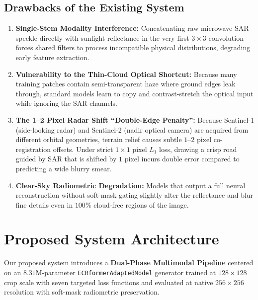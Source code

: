 \documentclass[12pt,a4paper]{report}
\begin{document}
\subsection{Drawbacks of the Existing System}
\begin{enumerate}
    \item \textbf{Single-Stem Modality Interference:} Concatenating raw microwave SAR speckle directly with sunlight reflectance in the very first $3\times 3$ convolution forces shared filters to process incompatible physical distributions, degrading early feature extraction.
    \item \textbf{Vulnerability to the Thin-Cloud Optical Shortcut:} Because many training patches contain semi-transparent haze where ground edges leak through, standard models learn to copy and contrast-stretch the optical input while ignoring the SAR channels.
    \item \textbf{The 1--2 Pixel Radar Shift ``Double-Edge Penalty'':} Because Sentinel-1 (side-looking radar) and Sentinel-2 (nadir optical camera) are acquired from different orbital geometries, terrain relief causes subtle $1$--$2\text{ pixel}$ co-registration offsets. Under strict $1\times 1$ pixel $L_1$ loss, drawing a crisp road guided by SAR that is shifted by $1\text{ pixel}$ incurs double error compared to predicting a wide blurry smear.
    \item \textbf{Clear-Sky Radiometric Degradation:} Models that output a full neural reconstruction without soft-mask gating slightly alter the reflectance and blur fine details even in $100\%$ cloud-free regions of the image.
\end{enumerate}

\section{Proposed System Architecture}
Our proposed system introduces a \textbf{Dual-Phase Multimodal Pipeline} centered on an $8.31\text{M}$-parameter \texttt{ECRformerAdaptedModel} generator trained at $128\times 128$ crop scale with seven targeted loss functions and evaluated at native $256\times 256$ resolution with soft-mask radiometric preservation.
\end{document}
